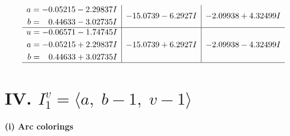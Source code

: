 \documentclass[1p]{elsarticle_modified}
\theoremstyle{definition}
\begin{document}
$$\begin{array}{c|c|c}
\begin{aligned}
a &= -0.05215 - 2.29837 I \\
b &= \phantom{-}0.44633 - 3.02735 I\end{aligned}
 & -15.0739 - 6.2927 I & -2.09938 + 4.32499 I \\ \hline\begin{aligned}
u &= -0.06571 - 1.74745 I \\
a &= -0.05215 + 2.29837 I \\
b &= \phantom{-}0.44633 + 3.02735 I\end{aligned}
 & -15.0739 + 6.2927 I & -2.09938 - 4.32499 I\\
 \hline 
 \end{array}$$\newpage\newpage\renewcommand{\arraystretch}{1}
\centering \section*{IV. $I^v_{1}= \langle a,\;b-1,\;v-1 \rangle$}
\flushleft \textbf{(i) Arc colorings}\\
\end{document}

